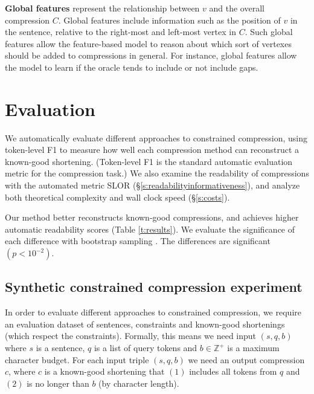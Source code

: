 \documentclass[11pt,a4paper]{article}
\begin{document}
\textbf{Global features} represent the relationship between $v$ and the overall compression $C$. Global features include information such as the position of $v$ in the sentence, relative to the right-most and left-most vertex in $C$. Such global features allow the feature-based model to reason about which sort of vertexes should be added to compressions in general. For instance, global features allow the model to learn if the oracle tends to include or not include gaps.

\section{Evaluation}\label{s:autoeval}

We automatically evaluate different approaches to constrained compression, using token-level F1 to measure how well each compression method can reconstruct a known-good shortening. (Token-level F1 is the standard automatic evaluation metric for the compression task.) We also examine the readability of compressions with the automated metric SLOR (\S\ref{s:readabilityinformativeness}), and analyze both theoretical complexity and wall clock speed (\S\ref{s:costs}).

Our method better reconstructs known-good compressions, and achieves higher automatic readability scores (Table \ref{t:results}). We evaluate the significance of each difference with bootstrap sampling \cite{D12-1091}. The differences are significant {\small $(p < 10^{-2})$}. 

\subsection{Synthetic constrained compression experiment}

In order to evaluate different approaches to constrained compression, we require an evaluation dataset of sentences, constraints and known-good shortenings (which respect the constraints). Formally, this means we need input $(s, q, b)$ where $s$ is a sentence, $q$ is a list of query tokens and $b \in \mathbb{Z}^{+}$ is a maximum character budget. For each input triple $(s,q,b)$ we need an output compression $c$, where $c$ is a known-good shortening that $(1)$ includes all tokens from $q$ and $(2)$ is no longer than $b$ (by character length). 
\end{document}
